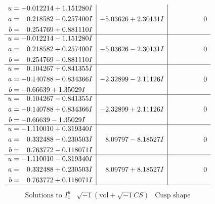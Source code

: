 \documentclass[1p]{elsarticle_modified}
\theoremstyle{definition}
\newcommand{\I}{\sqrt{-1}}
\begin{document}
$$\begin{array}{c|c|c}
\begin{aligned}
u &= -0.012214 + 1.151280 I \\
a &= \phantom{-}0.218582 - 0.257400 I \\
b &= \phantom{-}0.254769 + 0.881110 I\end{aligned}
 & -5.03626 + 2.30131 I & \phantom{-0.000000 } 0 \\ \hline\begin{aligned}
u &= -0.012214 - 1.151280 I \\
a &= \phantom{-}0.218582 + 0.257400 I \\
b &= \phantom{-}0.254769 - 0.881110 I\end{aligned}
 & -5.03626 - 2.30131 I & \phantom{-0.000000 } 0 \\ \hline\begin{aligned}
u &= \phantom{-}0.104267 + 0.841355 I \\
a &= -0.140788 - 0.834366 I \\
b &= -0.66639 + 1.35029 I\end{aligned}
 & -2.32899 - 2.11126 I & \phantom{-0.000000 } 0 \\ \hline\begin{aligned}
u &= \phantom{-}0.104267 - 0.841355 I \\
a &= -0.140788 + 0.834366 I \\
b &= -0.66639 - 1.35029 I\end{aligned}
 & -2.32899 + 2.11126 I & \phantom{-0.000000 } 0 \\ \hline\begin{aligned}
u &= -1.110010 + 0.319340 I \\
a &= \phantom{-}0.332488 - 0.230503 I \\
b &= \phantom{-}0.763772 - 0.118071 I\end{aligned}
 & \phantom{-}8.09797 - 8.18527 I & \phantom{-0.000000 } 0 \\ \hline\begin{aligned}
u &= -1.110010 - 0.319340 I \\
a &= \phantom{-}0.332488 + 0.230503 I \\
b &= \phantom{-}0.763772 + 0.118071 I\end{aligned}
 & \phantom{-}8.09797 + 8.18527 I & \phantom{-0.000000 } 0\\
 \hline 
 \end{array}$$\newpage$$\begin{array}{c|c|c}  
\text{Solutions to }I^u_{1}& \I (\text{vol} + \sqrt{-1}CS) & \text{Cusp shape}\\
 \hline 
\begin{aligned}

\end{aligned}
\end{array}$$
\end{document}
